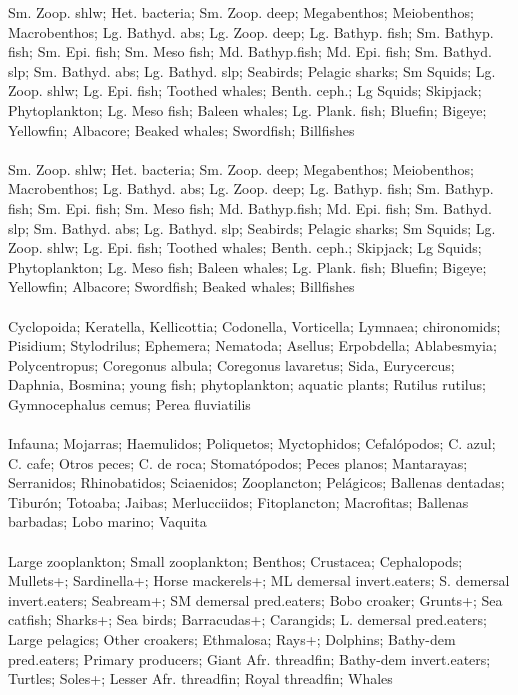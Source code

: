 \hline
Sm. Zoop. shlw; Het. bacteria; Sm. Zoop. deep; Megabenthos; Meiobenthos; Macrobenthos; Lg. Bathyd. abs; Lg. Zoop. deep; Lg. Bathyp. fish; Sm. Bathyp. fish; Sm. Epi. fish; Sm. Meso fish; Md. Bathyp.fish; Md. Epi. fish; Sm. Bathyd. slp; Sm. Bathyd. abs; Lg. Bathyd. slp; Seabirds; Pelagic sharks; Sm Squids; Lg. Zoop. shlw; Lg. Epi. fish; Toothed whales; Benth. ceph.; Lg Squids; Skipjack; Phytoplankton; Lg. Meso fish; Baleen whales; Lg. Plank. fish; Bluefin; Bigeye; Yellowfin; Albacore; Beaked whales; Swordfish; Billfishes\\
\fullhline
\hline
{} \\
\hline
Sm. Zoop. shlw; Het. bacteria; Sm. Zoop. deep; Megabenthos; Meiobenthos; Macrobenthos; Lg. Bathyd. abs; Lg. Zoop. deep; Lg. Bathyp. fish; Sm. Bathyp. fish; Sm. Epi. fish; Sm. Meso fish; Md. Bathyp.fish; Md. Epi. fish; Sm. Bathyd. slp; Sm. Bathyd. abs; Lg. Bathyd. slp; Seabirds; Pelagic sharks; Sm Squids; Lg. Zoop. shlw; Lg. Epi. fish; Toothed whales; Benth. ceph.; Skipjack; Lg Squids; Phytoplankton; Lg. Meso fish; Baleen whales; Lg. Plank. fish; Bluefin; Bigeye; Yellowfin; Albacore; Swordfish; Beaked whales; Billfishes\\
\fullhline
\hline
{} \\
\hline
Cyclopoida; Keratella, Kellicottia; Codonella, Vorticella; Lymnaea; chironomids; Pisidium; Stylodrilus; Ephemera; Nematoda; Asellus; Erpobdella; Ablabesmyia; Polycentropus; Coregonus albula; Coregonus lavaretus; Sida, Eurycercus; Daphnia, Bosmina; young fish; phytoplankton; aquatic plants; Rutilus rutilus; Gymnocephalus cemus; Perea fluviatilis\\
\fullhline
\hline
{} \\
\hline
Infauna; Mojarras; Haemulidos; Poliquetos; Myctophidos; Cefalópodos; C. azul; C. cafe; Otros peces; C. de roca; Stomatópodos; Peces planos; Mantarayas; Serranidos; Rhinobatidos; Sciaenidos; Zooplancton; Pelágicos; Ballenas dentadas; Tiburón; Totoaba; Jaibas; Merlucciidos; Fitoplancton; Macrofitas; Ballenas barbadas; Lobo marino; Vaquita\\
\fullhline
\hline
{} \\
\hline
Large zooplankton; Small zooplankton; Benthos; Crustacea; Cephalopods; Mullets+; Sardinella+; Horse mackerels+; ML demersal invert.eaters; S. demersal invert.eaters; Seabream+; SM demersal pred.eaters; Bobo croaker; Grunts+; Sea catfish; Sharks+; Sea birds; Barracudas+; Carangids; L. demersal pred.eaters; Large pelagics; Other croakers; Ethmalosa; Rays+; Dolphins; Bathy-dem pred.eaters; Primary producers; Giant Afr. threadfin; Bathy-dem invert.eaters; Turtles; Soles+; Lesser Afr. threadfin; Royal threadfin; Whales\\
